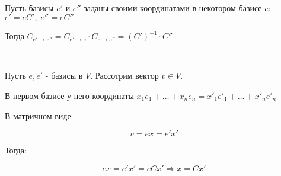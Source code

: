 \bigskip


\begin{problem}~

    Пусть базисы $e'$ и $e''$ заданы своими координатами в некотором базисе $e$: $e' = eC', \; e'' = e C''$

    Тогда $C_{e' \rightarrow e''} = C_{e' \rightarrow e} \cdot C_{e \rightarrow e''} = (C')^{-1} \cdot C''$

\end{problem}


\bigskip


\begin{lemma}~
    
    Пусть $e, e'$ - базисы в $V$. Рассотрим вектор $v \in V$.

    В первом базисе у него координаты $x_1 e_1 + \dots + x_n e_n = x'_1 e'_1 + \dots + x'_n e'_n$

    В матричном виде:

    $$v = ex = e'x'$$

    Тогда:

    $$ex = e'x' = e C x' \Rightarrow x = C x'$$

    \begin{comment}
    
        В частности, чтобы найти координаты в новом базисе, нужно обратить матрицу $C$ (то есть решить СЛУ $(C | x)$)

    \end{comment}

\end{lemma}


\bigskip


